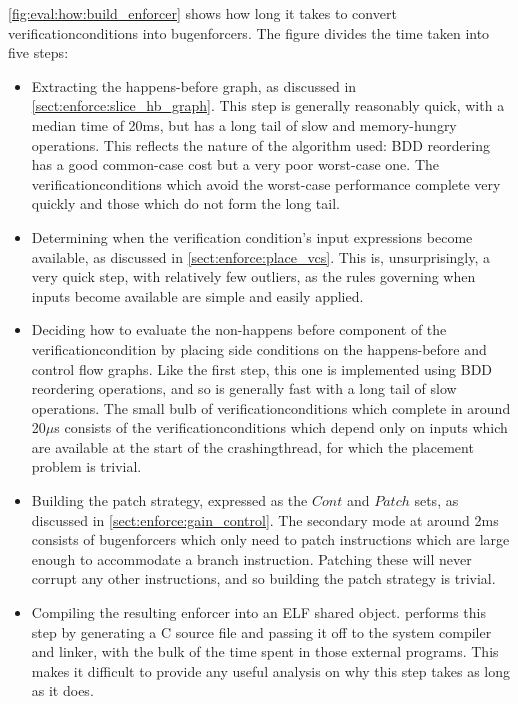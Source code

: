 \noindent
\autoref{fig:eval:how:build_enforcer} shows how long it takes to
convert \glspl{verificationcondition} into \glspl{bugenforcer}.  The
figure divides the time taken into five steps:
\begin{itemize}
\item Extracting the happens-before graph, as discussed in
  \autoref{sect:enforce:slice_hb_graph}.  This step is generally
  reasonably quick, with a median time of 20ms, but has a long tail of
  slow and memory-hungry operations.  This reflects the nature of the
  algorithm used: BDD reordering has a good common-case cost but a
  very poor worst-case one.  The \glspl{verificationcondition} which
  avoid the worst-case performance complete very quickly and those
  which do not form the long tail.
\item Determining when the verification condition's input expressions
  become available, as discussed in \autoref{sect:enforce:place_vcs}.
  This is, unsurprisingly, a very quick step, with relatively few
  outliers, as the rules governing when inputs become available are
  simple and easily applied.
\item Deciding how to evaluate the non-happens before component of the
  \gls{verificationcondition} by placing side conditions on the
  happens-before and control flow graphs.  Like the first step, this
  one is implemented using BDD reordering operations, and so is
  generally fast with a long tail of slow operations.  The small bulb
  of \glspl{verificationcondition} which complete in around 20$\mu$s
  consists of the \glspl{verificationcondition} which depend only on
  inputs which are available at the start of the \gls{crashingthread},
  for which the placement problem is trivial.
\item Building the patch strategy, expressed as the $\mathit{Cont}$
  and $\mathit{Patch}$ sets, as discussed in
  \autoref{sect:enforce:gain_control}.  The secondary mode at around
  2ms consists of \glspl{bugenforcer} which only need to patch
  instructions which are large enough to accommodate a branch
  instruction.  Patching these will never corrupt any other
  instructions, and so building the patch strategy is trivial.
\item Compiling the resulting enforcer into an ELF shared object.
  {\Implementation} performs this step by generating a C source file
  and passing it off to the system compiler and linker, with the bulk
  of the time spent in those external programs.  This makes it
  difficult to provide any useful analysis on why this step takes as
  long as it does.
\end{itemize}
